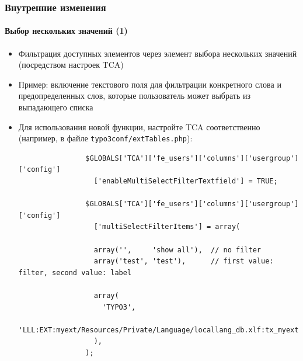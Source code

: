 \begin{frame}[fragile]
	\frametitle{Внутренние изменения}
	\framesubtitle{Выбор нескольких значений (1)}

	\lstset{
		basicstyle=\tiny\ttfamily
	}

	\begin{itemize}
		\item Фильтрация доступных элементов через элемент выбора нескольких значений (посредством настроек TCA)
		\item Пример: включение текстового поля для фильтрации конкретного слова и предопределенных слов,
		которые пользователь может выбрать из выпадающего списка

		\item Для использования новой функции, настройте TCA соответственно\newline
			(например, в файле \texttt{typo3conf/extTables.php}):


			\begin{lstlisting}
				$GLOBALS['TCA']['fe_users']['columns']['usergroup']['config']
				  ['enableMultiSelectFilterTextfield'] = TRUE;

				$GLOBALS['TCA']['fe_users']['columns']['usergroup']['config']
				  ['multiSelectFilterItems'] = array(

				  array('',     'show all'),  // no filter
				  array('test', 'test'),      // first value: filter, second value: label

				  array(
				    'TYPO3',
				    'LLL:EXT:myext/Resources/Private/Language/locallang_db.xlf:tx_myext.label.typo3'
				  ),
				);
			\end{lstlisting}

	\end{itemize}

\end{frame}



